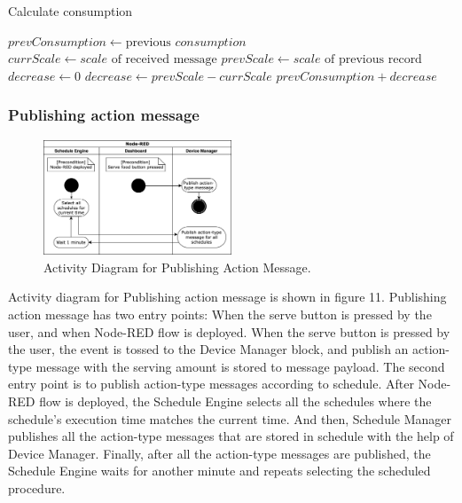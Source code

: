 \documentclass[conference]{IEEEtran}
\begin{document}
\begin{algorithm}
\caption{Calculate consumption}\label{algo}
\begin{algorithmic}[1]
        \State $prevConsumption \gets \text{previous } \textit{consumption}$
        \State $currScale \gets \textit{scale} \text{ of received message}$
        \State $prevScale \gets \textit{scale} \text{ of  previous record}$
        \State $decrease \gets 0$
            \State $decrease \gets prevScale - currScale$
        \EndIf
        \Return $prevConsumption + decrease$
    \EndProcedure
\end{algorithmic}
\end{algorithm}

\subsubsection{Publishing action message}
\begin{figure}[htbp]
\centerline{\includegraphics[width=0.5\textwidth]{./images/publishActionMessage.png}}
\caption{Activity Diagram for Publishing Action Message.}
\label{fig}
\end{figure}

Activity diagram for Publishing action message is shown in figure 11. Publishing action message has two entry points: When the serve button is pressed by the user, and when Node-RED flow is deployed. When the serve button is pressed by the user, the event is tossed to the Device Manager block, and publish an action-type message with the serving amount is stored to message payload. The second entry point is to publish action-type messages according to schedule. After Node-RED flow is deployed, the Schedule Engine selects all the schedules where the schedule’s execution time matches the current time. And then, Schedule Manager publishes all the action-type messages that are stored in schedule with the help of Device Manager. Finally, after all the action-type messages are published, the Schedule Engine waits for another minute and repeats selecting the scheduled procedure.
\end{document}
